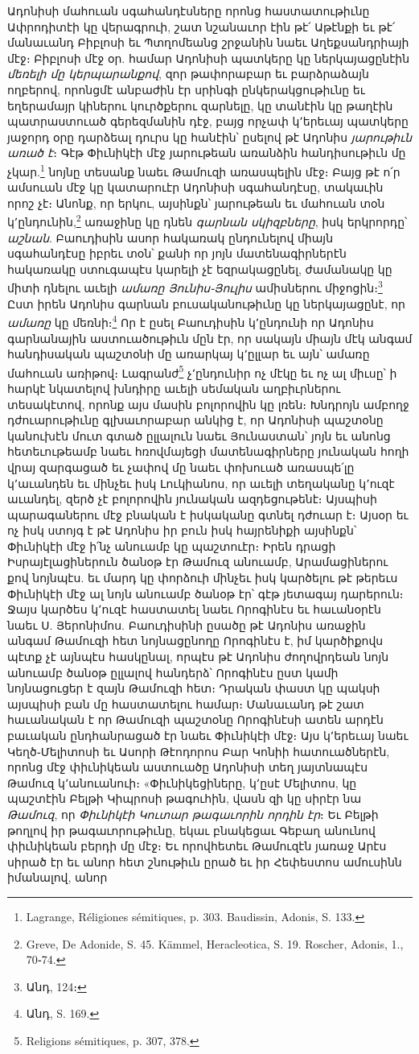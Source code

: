 \documentclass{article}
\begin{document}
{Ադոնիսի մահուան սգահանդէսները որոնց հաստատութիւնը Ափրոդիտէի կը վերագրուի, շատ նշանաւոր էին թէ՛ Աթէնքի եւ թէ՛ մանաւանդ Բիբլոսի եւ Պտղոմեանց շրջանին նաեւ Աղեքսանդրիայի մէջ։ Բիբլոսի մէջ օր. համար Ադոնիսի պատկերը կը ներկայացընէին \emph{մեռելի մը կերպարանքով}, զոր թափորաբար եւ բարձրաձայն ողբերով, որոնցմէ անբաժին էր սրինգի ընկերակցութիւնը եւ եղերամայր կիներու կուրծքերու զարնելը, կը տանէին կը թաղէին պատրաստուած գերեզմանին դէջ, բայց որչափ կ՚երեւայ պատկերը յաջորդ օրը դարձեալ դուրս կը հանէին՝ ըսելով թէ Ադոնիս \emph{յարութիւն առած է}։ Գէթ Փիւնիկէի մէջ յարութեան առանձին հանդիսութիւն մը չկար.\footnote{Lagrange, Réligiones sémitiques, p. 303. Baudissin, Adonis, S. 133.} նոյնը տեսանք նաեւ Թամուզի առասպելին մէջ։ Բայց թէ ո՛ր ամսուան մէջ կը կատարուէր Ադոնիսի սգահանդէսը, տակաւին որոշ չէ։ Անոնք, որ երկու, այսինքն՝ յարութեան եւ մահուան տօն կ՚ընդունին,\footnote{Greve, De Adonide, S. 45. Kämmel, Heracleotica, S. 19. Roscher, Adonis, 1., 70֊74.} առաջինը կը դնեն \emph{գարնան սկիզբները}, իսկ երկրորդը՝ \emph{աշնան}. Բաուդիսին ասոր հակառակ ընդունելով միայն սգահանդէսը իբրեւ տօն՝ քանի որ յոյն մատենագիրներէն հակառակը ստուգապէս կարելի չէ եզրակացընել, ժամանակը կը միտի դնելու աւելի \emph{ամառը Յունիս֊Յուլիս} ամիսներու միջոցին։\footnote{Անդ, 124։} Ըստ իրեն Ադոնիս գարնան բուսականութիւնը կը ներկայացընէ, որ \emph{ամառը} կը մեռնի։\footnote{Անդ, S. 169.} Որ է ըսել Բաուդիսին կ՚ընդունի որ Ադոնիս գարնանային աստուածութիւն մըն էր, որ սակայն միայն մէկ անգամ հանդիսական պաշտօնի մը առարկայ կ՚ըլլար եւ այն՝ ամառը մահուան առիթով։ Լագրանժ\footnote{Religions sémitiques, p. 307, 378.} չ՚ընդունիր ոչ մէկը եւ ոչ ալ միւսը՝ ի հարկէ նկատելով խնդիրը աւելի սեմական աղբիւրներու տեսակէտով, որոնք այս մասին բոլորովին կը լռեն։ Խնդրոյն ամբողջ դժուարութիւնը գլխաւորաբար անկից է, որ Ադոնիսի պաշտօնը կանուխէն մուտ գտած ըլլալուն նաեւ Յունաստան՝ յոյն եւ անոնց հետեւութեամբ նաեւ հռովմայեցի մատենագիրները յունական հողի վրայ զարգացած եւ չափով մը նաեւ փոխուած առասպե՛լը կ՚աւանդեն եւ մինչեւ իսկ Լուկիանոս, որ աւելի տեղականը կ՚ուզէ աւանդել, զերծ չէ բոլորովին յունական ազդեցութենէ։ Այսպիսի պարագաներու մէջ բնական է իսկականը գտնել դժուար է։ Այսօր եւ ոչ իսկ ստոյգ է թէ Ադոնիս իր բուն իսկ հայրենիքի այսինքն՝ Փիւնիկէի մէջ ի՛նչ անուամբ կը պաշտուէր։ Իրեն դրացի Իսրայէլացիներուն ծանօթ էր Թամուզ անուամբ, Արամացիներու քով նոյնպէս. եւ մարդ կը փորձուի մինչեւ իսկ կարծելու թէ թերեւս Փիւնիկէի մէջ ալ նոյն անուամբ ծանօթ էր՝ գէթ յետագայ դարերուն։ Ջայս կարծես կ՚ուզէ հաստատել նաեւ Որոգինէս եւ հաւանօրէն նաեւ Ս. Յերոնիմոս. Բաուդիսինի ըսածը թէ Ադոնիս առաջին անգամ Թամուզի հետ նոյնացընողը Որոգինէս է, իմ կարծիքովս պէտք չէ այնպէս հասկընալ, որպէս թէ Ադոնիս ժողովրդեան նոյն անուամբ ծանօթ ըլլալով հանդերձ՝ Որոգինէս ըստ կամի նոյնացուցեր է զայն Թամուզի հետ։ Դրական փաստ կը պակսի այսպիսի բան մը հաստատելու համար։ Մանաւանդ թէ շատ հաւանական է որ Թամուզի պաշտօնը Որոգինէսի ատեն արդէն բաւական ընդհանրացած էր նաեւ Փիւնիկէի մէջ։ Այս կ՚երեւայ նաեւ Կեղծ֊Մելիտոսի եւ Ասորի Թէոդորոս Բար Կոնիի հատուածներէն, որոնց մէջ փիւնիկեան աստուածը Ադոնիսի տեղ յայտնապէս Թամուզ կ՚անուանուի։ «Փիւնիկեցիները, կ՚ըսէ Մելիտոս, կը պաշտէին Բելթի Կիպրոսի թագուհին, վասն զի կը սիրէր նա \emph{Թամուզ}, որ \emph{Փիւնիկէի Կուտար թագաւորին որդին էր}։ Եւ Բելթի թողլով իր թագաւորութիւնը, եկաւ բնակեցաւ Գեբաղ անունով փիւնիկեան բերդի մը մէջ։ Եւ որովհետեւ Թամուզէն յառաջ Արէս սիրած էր եւ անոր հետ շնութիւն ըրած եւ իր Հեփեստոս ամուսինն իմանալով, անոր }
\end{document}
